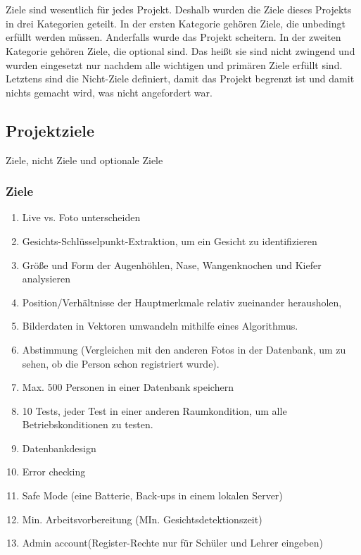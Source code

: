 \chapter{\docname}
\label{\docname}
Ziele sind wesentlich für jedes Projekt. Deshalb wurden die Ziele dieses Projekts in drei Kategorien geteilt.
In der ersten Kategorie gehören Ziele, die unbedingt erfüllt werden müssen. Anderfalls wurde das Projekt scheitern.
In der zweiten Kategorie gehören Ziele, die optional sind. Das heißt sie sind nicht zwingend und wurden eingesetzt nur nachdem alle wichtigen und primären Ziele erfüllt sind.
Letztens sind die Nicht-Ziele definiert, damit das Projekt begrenzt ist und damit nichts gemacht wird, was nicht angefordert war.
\section{Projektziele}
Ziele, nicht Ziele und optionale Ziele
\subsection{Ziele}
\begin{enumerate}
	\item Live vs. Foto unterscheiden
	\item Gesichts-Schlüsselpunkt-Extraktion, um ein Gesicht zu identifizieren  

\item Größe und Form der Augenhöhlen, Nase, Wangenknochen und Kiefer analysieren 

\item Position/Verhältnisse der Hauptmerkmale relativ zueinander herausholen, 

\item Bilderdaten in Vektoren umwandeln mithilfe eines Algorithmus. 

\item Abstimmung (Vergleichen mit den anderen Fotos in der Datenbank, um zu sehen, ob die Person schon registriert wurde). 

\item Max. 500 Personen in einer Datenbank speichern

\item 10 Tests, jeder Test in einer anderen Raumkondition, um    alle Betriebskonditionen zu testen. 

\item Datenbankdesign 

\item Error checking

\item Safe Mode (eine Batterie, Back-ups in einem lokalen         Server) 

\item Min. Arbeitsvorbereitung (MIn. Gesichtsdetektionszeit)
\item Admin account(Register-Rechte nur für Schüler und Lehrer eingeben) 

\end{enumerate}
